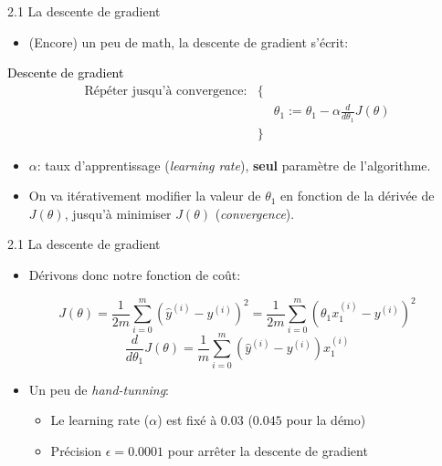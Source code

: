  
\begin{frame}{2.1 La descente de gradient}
  \begin{itemize}
  \item (Encore) un peu de math, la descente de gradient s'écrit:
  \end{itemize}
  \begin{beamerboxesrounded}[scheme=suppervise,width=\textwidth]{\textcolor{black}{Descente de gradient}}    
    \vspace{-0.2cm}
    \begin{equation*}
      \begin{matrix} \text{Répéter jusqu'à convergence:} & \{ & \\ & & \theta_{1} := \theta_{1} - \alpha \frac{d}{d\theta_{1}}J(\theta) \\ & \} & \end{matrix}
    \end{equation*}
    \vspace{-0.2cm}
    \end{beamerboxesrounded}
    \begin{itemize}
    \item $\alpha$: taux d'apprentissage (\textit{learning rate}), \textbf{seul} paramètre de l'algorithme.
      \vspace{0.2cm}
    \item On va itérativement modifier la valeur de $\theta_{1}$ en fonction de la dérivée de $J(\theta)$, jusqu'à minimiser $J(\theta)$ (\textit{convergence}).
    \end{itemize}
\end{frame}

\begin{frame}{2.1 La descente de gradient}
  \begin{itemize}
  \item Dérivons donc notre fonction de coût:
  \end{itemize}
  \begin{equation*}
    J(\theta) = \frac{1}{2m} \displaystyle\sum_{i=0}^{m}(\hat{y}^{(i)} - y^{(i)})^{2} = \frac{1}{2m} \displaystyle\sum_{i=0}^{m}(\theta_{1}x_{1}^{(i)} - y^{(i)})^{2}
  \end{equation*}
  \begin{equation*}
      \frac{d}{d\theta_{1}}J(\theta) = \frac{1}{m}\displaystyle\sum_{i=0}^{m}(\hat{y}^{(i)} - y^{(i)}) x_{1}^{(i)}
  \end{equation*}
  \begin{itemize}
  \item Un peu de \textit{hand-tunning}:
    \begin{itemize}
      \normalsize
    \item Le learning rate ($\alpha$) est fixé à $0.03$ ($0.045$ pour la démo)
    \item Précision $\epsilon = 0.0001$ pour arrêter la descente de gradient 
    \end{itemize}
  \end{itemize}
\end{frame}

